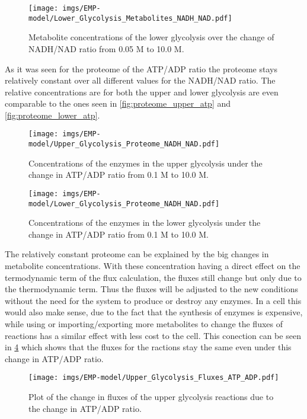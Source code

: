 \begin{figure}[H]
    \centering
    \texttt{[image: imgs/EMP-model/Lower\_Glycolysis\_Metabolites\_NADH\_NAD.pdf]}
    \caption{Metabolite concentrations of the lower glycolysis over the change of NADH/NAD ratio from 0.05 M to 10.0 M.}
    \label{fig:metabolites_lower_nadh}
\end{figure}

As it was seen for the proteome of the ATP/ADP ratio the proteome stays relatively constant over all different values for the NADH/NAD ratio. The relative concentrations are for both the upper and lower glycolysis are even comparable to the ones seen in \ref{fig:proteome_upper_atp} and \ref{fig:proteome_lower_atp}.
\begin{figure}[H]
    \centering
    \texttt{[image: imgs/EMP-model/Upper\_Glycolysis\_Proteome\_NADH\_NAD.pdf]}
    \caption{Concentrations of the enzymes in the upper glycolysis under the change in ATP/ADP ratio from 0.1 M to 10.0 M.}
    \label{fig:proteome_upper_nadh}
\end{figure}

\begin{figure}[H]
    \centering
    \texttt{[image: imgs/EMP-model/Lower\_Glycolysis\_Proteome\_NADH\_NAD.pdf]}
    \caption{Concentrations of the enzymes in the lower glycolysis under the change in ATP/ADP ratio from 0.1 M to 10.0 M.}
    \label{fig:proteome_lower_nadh}
\end{figure}

The relatively constant proteome can be explained by the big changes in metabolite concentrations. With these concentration having a direct effect on the termodynamic term of the flux calculation, the fluxes still change but only due to the thermodynamic term. Thus the fluxes will be adjusted to the new conditions without the need for the system to produce or destroy any enzymes. In a cell this would also make sense, due to the fact that the synthesis of enzymes is expensive, while using or importing/exporting more metabolites to change the fluxes of reactions has a similar effect with less cost to the cell.
This conection can be seen in \ref{fig:upper_fluxes_atp} which shows that the fluxes for the ractions stay the same even under this change in ATP/ADP ratio.

\begin{figure}[H]
    \centering
    \texttt{[image: imgs/EMP-model/Upper\_Glycolysis\_Fluxes\_ATP\_ADP.pdf]}
    \caption{Plot of the change in fluxes of the upper glycolysis reactions due to the change in ATP/ADP ratio.}
    \label{fig:upper_fluxes_atp}
\end{figure}


